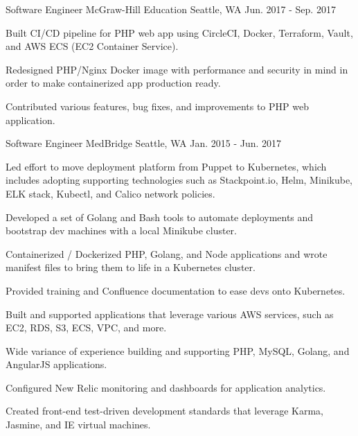 \begin{cventries}
\cventry
{Software Engineer} %
{McGraw-Hill Education} %
{Seattle, WA} %
{Jun. 2017 - Sep. 2017} %
{ %
\begin{cvitems}
\item {Built CI/CD pipeline for PHP web app using CircleCI, Docker, Terraform, Vault, and AWS ECS (EC2 Container Service).}
\item {Redesigned PHP/Nginx Docker image with performance and security in mind in order to make containerized app production ready.}
\item {Contributed various features, bug fixes, and improvements to PHP web application.}
\end{cvitems}
}


\cventry
{Software Engineer} %
{MedBridge} %
{Seattle, WA} %
{Jan. 2015 - Jun. 2017} %
{ %
\begin{cvitems}
\item {Led effort to move deployment platform from Puppet to Kubernetes, which includes adopting supporting technologies such as Stackpoint.io, Helm, Minikube, ELK stack, Kubectl, and Calico network policies.}
\item {Developed a set of Golang and Bash tools to automate deployments and bootstrap dev machines with a local Minikube cluster.}
\item {Containerized / Dockerized PHP, Golang, and Node applications and wrote manifest files to bring them to life in a Kubernetes cluster.}
\item {Provided training and Confluence documentation to ease devs onto Kubernetes.}
\item {Built and supported applications that leverage various AWS services, such as EC2, RDS, S3, ECS, VPC, and more.}
\item {Wide variance of experience building and supporting PHP, MySQL, Golang, and AngularJS applications.}
\item {Configured New Relic monitoring and dashboards for application analytics.}
\item {Created front-end test-driven development standards that leverage Karma, Jasmine, and IE virtual machines.}
\end{cvitems} 
}



\end{cventries}
